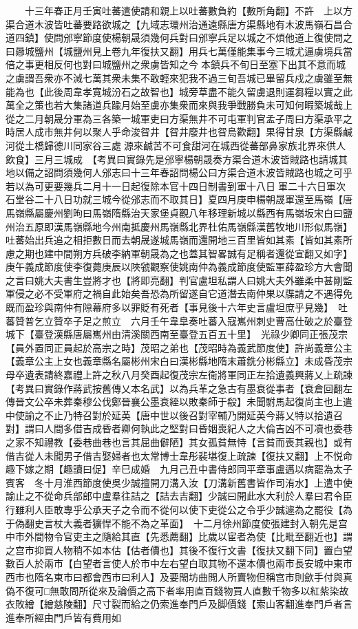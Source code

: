 　　十三年春正月壬寅吐蕃遣使請和親上以吐蕃數負約【數所角翻】不許　上以方渠合道木波皆吐蕃要路欲城之【九域志環州治通遠縣唐方渠縣地有木波馬嶺石昌合道四鎮】使問邠寧節度使楊朝晟須幾何兵對曰邠寧兵足以城之不煩他道上復使問之曰曏城鹽州【城鹽州見上卷九年復扶又翻】用兵七萬僅能集事今三城尤逼虜境兵當倍之事更相反何也對曰城鹽州之衆虜皆知之今本鎮兵不旬日至塞下出其不意而城之虜謂吾衆亦不減七萬其衆未集不敢輕來犯我不過三旬吾城已畢留兵戍之虜雖至無能為也【此後周韋孝寛城汾石之故智也】城旁草盡不能久留虜退則運芻糧以實之此萬全之策也若大集諸道兵踰月始至虜亦集衆而來與我爭戰勝負未可知何暇築城哉上從之二月朝晟分軍為三各築一城軍吏曰方渠無井不可屯軍判官孟子周曰方渠承平之時居人成市無井何以聚人乎命浚眢井【眢井廢井也眢烏歡翻】果得甘泉【方渠縣鹹河從土橋歸德川同家谷三處源來鹹苦不可食甜河在城西從蕃部鼻家族北界來供人飲食】三月三城成　【考異曰實錄先是邠寧楊朝晟奏方渠合道木波皆賊路也請城其地以備之詔問須幾何人邠志曰十三年春詔問楊公曰方渠合道木波皆賊路也城之可乎若以為可更要幾兵二月十一日起復除本官十四日制書到軍十八日軍二十六日軍次石堂谷二十八日功就三城今從邠志而不取其日】夏四月庚申楊朝晟軍還至馬嶺【唐馬嶺縣屬慶州劉昫曰馬嶺隋縣治天家堡貞觀八年移理新城以縣西有馬嶺坂宋白曰鹽州治五原即漢馬嶺縣地今州南抵慶州馬嶺縣北界杜佑馬嶺縣漢舊牧地川形似馬嶺】吐蕃始出兵追之相拒數日而去朝晟遂城馬嶺而還開地三百里皆如其素【皆如其素所慮之期也建中間朔方兵破李納軍朝晟為之也蓋其智畧誠有足稱者還從宣翻又如字】　庚午義成節度使李復薨庚辰以陜虢觀察使姚南仲為義成節度使監軍薛盈珍方大會聞之言曰姚大夫書生豈將才也【將即亮翻】判官盧坦私謂人曰姚大夫外雖柔中甚剛監軍侵之必不受軍府之禍自此始矣吾恐為所留遂自它道潛去南仲果以牒請之不遇得免既而盈珍與南仲有隙幕府多以罪貶有死者【事見後十六年史言盧坦庶乎見幾】　吐蕃贊普乞立贊卒子足之煎立　六月壬午韋臯奏吐蕃入寇嶲州刺史曹高仕破之於臺登城下【臺登漢縣唐屬嶲州由清溪關西南至臺登五百五十里】　光祿少卿同正張茂宗【員外置同正員起於高宗之時】茂昭之弟也【茂昭時為義武節度使】許尚義章公主【義章公主上女也義章縣名屬彬州宋白曰漢彬縣地隋末蕭銑分彬縣立】未成昏茂宗母卒遺表請終嘉禮上許之秋八月癸酉起復茂宗左衛將軍同正左拾遺義興蔣乂上疏諫　【考異曰實錄作蔣武按舊傳乂本名武】以為兵革之急古有墨衰從事者【衰倉回翻左傳晉文公卒未葬秦穆公伐鄭晉襄公墨衰絰以敗秦師于殽】未聞駙馬起復尚主也上遣中使諭之不止乃特召對於延英【唐中世以後召對宰輔乃開延英今蔣乂特以拾遺召對】謂曰人間多借吉成昏者卿何執此之堅對曰昏姻喪紀人之大倫吉凶不可凟也委巷之家不知禮教【委巷曲巷也言其屈曲僻陋】其女孤貧無恃【言貧而喪其親也】或有借吉從人未聞男子借吉娶婦者也太常博士韋彤裴堪復上疏諫【復扶又翻】上不悦命趣下嫁之期【趣讀曰促】辛巳成婚　九月己丑中書侍郎同平章事盧邁以病罷為太子賓客　冬十月淮西節度使吳少誠擅開刀溝入汝【刀溝新舊書皆作司洧水】上遣中使諭止之不從命兵部郎中盧羣往詰之【詰去吉翻】少誠曰開此水大利於人羣曰君令臣行雖利人臣敢專乎公承天子之令而不從何以使下吏從公之令乎少誠遽為之罷役【為于偽翻史言杖大義者獷悍不能不為之革面】　十二月徐州節度使張建封入朝先是宫中市外間物令官吏主之隨給其直【先悉薦翻】比歲以宦者為使【比毗至翻近也】謂之宫市抑買人物稍不如本估【估者價也】其後不復行文書【復扶又翻下同】置白望數百人於兩市【白望者言使人於市中左右望白取其物不還本價也兩市長安城中東市西市也隋名東市曰都會西市曰利人】及要閙坊曲閲人所賣物但稱宫市則歛手付與真偽不復可□無敢問所從來及論價之高下者率用直百錢物買人直數千物多以紅紫染故衣敗繒【繒慈陵翻】尺寸裂而給之仍索進奉門戶及脚價錢【索山客翻進奉門戶者言進奉所經由門戶皆有費用如
